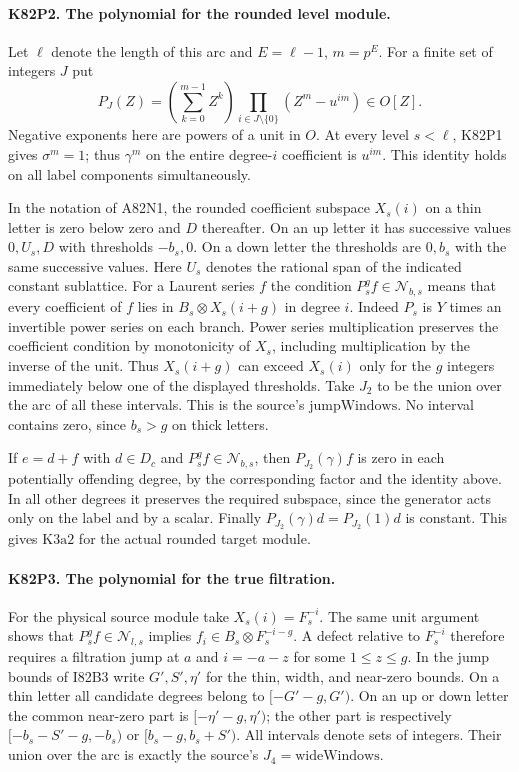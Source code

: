\paragraph{K82P2. The polynomial for the rounded level module.}
Let $\ell$ denote the length of this arc and $E=\ell-1$, $m=p^E$.
For a finite set of integers $J$ put
\[
 P_J(Z)=\left(\sum_{k=0}^{m-1}Z^k\right)
       \prod_{i\in J\setminus\{0\}}(Z^m-u^{im})\in O[Z].
\]
Negative exponents here are powers of a unit in $O$. At every
level $s<\ell$, K82P1 gives $\sigma^m=1$; thus $\gamma^m$
on the entire degree-$i$ coefficient is $u^{im}$. This identity
holds on all label components simultaneously.

In the notation of A82N1, the rounded coefficient subspace
$X_s(i)$ on a thin letter is zero below zero and $D$ thereafter.
On an up letter it has successive values $0,U_s,D$ with
thresholds $-b_s,0$. On a down letter the thresholds are $0,b_s$
with the same successive values. Here $U_s$ denotes the
rational span of the indicated constant sublattice.
For a Laurent series $f$ the condition
$P_s^g f\in\mathcal N_{b,s}$ means that every coefficient of $f$
lies in $B_s\otimes X_s(i+g)$ in degree $i$. Indeed $P_s$ is
$Y$ times an invertible power series on each branch. Power series
multiplication preserves the coefficient condition by monotonicity
of $X_s$, including multiplication by the inverse of the unit.
Thus $X_s(i+g)$ can exceed $X_s(i)$ only for the $g$ integers
immediately below one of the displayed thresholds.
Take $J_2$ to be the union over the arc of all these intervals.
This is the source's $\mathrm{jumpWindows}$. No interval contains
zero, since $b_s>g$ on thick letters.

If $e=d+f$ with $d\in D_c$ and $P_s^g f\in\mathcal N_{b,s}$,
then $P_{J_2}(\gamma)f$ is zero in each potentially offending
degree, by the corresponding factor and the identity above.
In all other degrees it preserves the required subspace, since
the generator acts only on the label and by a scalar.
Finally $P_{J_2}(\gamma)d=P_{J_2}(1)d$ is constant.
This gives $\mathrm{K3a2}$ for the actual rounded target module.

\paragraph{K82P3. The polynomial for the true filtration.}
For the physical source module take $X_s(i)=F_s^{-i}$.
The same unit argument shows that $P_s^g f\in\mathcal N_{l,s}$
implies $f_i\in B_s\otimes F_s^{-i-g}$. A defect relative
to $F_s^{-i}$ therefore requires a filtration jump at $a$ and
$i=-a-z$ for some $1\le z\le g$. In the jump bounds of I82B3
write $G',S',\eta'$ for the thin, width, and near-zero bounds.
On a thin letter all candidate degrees belong to
$[-G'-g,G')$. On an up or down letter the common near-zero
part is $[-\eta'-g,\eta')$; the other part is respectively
$[-b_s-S'-g,-b_s)$ or $[b_s-g,b_s+S')$. All intervals
denote sets of integers. Their union over the arc is exactly the
source's $J_4=\mathrm{wideWindows}$.

